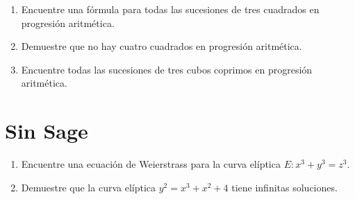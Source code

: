 \documentclass[11pt, reqno]{amsart}
\begin{document}
\begin{enumerate}
	\item Encuentre una fórmula para todas las sucesiones de tres cuadrados en progresión aritmética.
	\item Demuestre que no hay cuatro cuadrados en progresión aritmética.
	\item Encuentre todas las sucesiones de tres cubos coprimos en progresión aritmética.
\end{enumerate}

\section{Sin Sage}
\begin{enumerate}[resume]
	\item Encuentre una ecuación de Weierstrass para la curva elíptica $E \colon x^3 + y^3 = z^3$.
	\item Demuestre que la curva elíptica $y^2 = x^3 + x^2 + 4$ tiene infinitas soluciones.
\end{enumerate}

\nocite{silverman:elliptic}
\printbibliography[title={Referencias y lecturas adicionales}]
\end{document}
